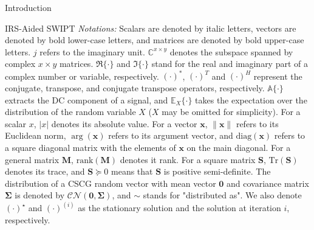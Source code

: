 \documentclass[journal]{IEEEtran}
\begin{document}
\begin{section}{Introduction}
\begin{subsection}{IRS-Aided SWIPT}
			\textit{Notations:} Scalars are denoted by italic letters, vectors are denoted by bold lower-case letters, and matrices are denoted by bold upper-case letters. $j$ refers to the imaginary unit. $\mathbb{C}^{x \times y}$ denotes the subspace spanned by complex $x \times y$ matrices. $\Re\{\cdot\}$ and $\Im\{\cdot\}$ stand for the real and imaginary part of a complex number or variable, respectively. $(\cdot)^*$, $(\cdot)^T$ and $(\cdot)^H$ represent the conjugate, transpose, and conjugate transpose operators, respectively. $\mathbb{A}\{\cdot\}$ extracts the DC component of a signal, and $\mathbb{E}_X\{\cdot\}$ takes the expectation over the distribution of the random variable $X$ ($X$ may be omitted for simplicity). For a scalar $x$, $\lvert{x}\rvert$ denotes its absolute value. For a vector $\boldsymbol{x}$, $\lVert{\boldsymbol{x}}\rVert$ refers to its Euclidean norm, $\arg(\boldsymbol{x})$ refers to its argument vector, and $\mathrm{diag}(\boldsymbol{x})$ refers to a square diagonal matrix with the elements of $\boldsymbol{x}$ on the main diagonal. For a general matrix $\boldsymbol{M}$, $\mathrm{rank}(\boldsymbol{M})$ denotes it rank. For a square matrix $\boldsymbol{S}$, $\mathrm{Tr}(\boldsymbol{S})$ denotes its trace, and $\boldsymbol{S} \succeq 0$ means that $\boldsymbol{S}$ is positive semi-definite. The distribution of a CSCG random vector with mean vector $\boldsymbol{0}$ and covariance matrix $\boldsymbol{\Sigma}$ is denoted by $\mathcal{CN}(\boldsymbol{0},\boldsymbol{\Sigma})$, and $\sim$ stands for "distributed as". We also denote $(\cdot)^{\star}$ and $(\cdot)^{(i)}$ as the stationary solution and the solution at iteration $i$, respectively.
		\end{subsection}
	\end{section}
\end{document}
